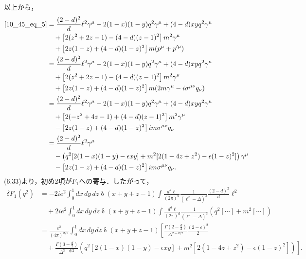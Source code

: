 以上から，
\begin{align*}
  \eqref{10_45_eq_5} &= \frac{(2-d)^2}{d} \ell^2 \gamma^\mu - 2 (1-x)(1-y) q^2 \gamma^\mu + (4-d) xy q^2 \gamma^\mu \\
  & \quad + \left[ 2(z^2 + 2z - 1) - (4-d)(z-1)^2 \right] m^2 \gamma^\mu \\
  & \quad + \left[ 2 z(1-z) + (4-d) (1-z)^2 \right] m(p^\mu + p'^\mu) \\
  &= \frac{(2-d)^2}{d} \ell^2 \gamma^\mu - 2 (1-x)(1-y) q^2 \gamma^\mu + (4-d) xy q^2 \gamma^\mu \\
  & \quad + \left[ 2(z^2 + 2z - 1) - (4-d)(z-1)^2 \right] m^2 \gamma^\mu \\
  & \quad + \left[ 2 z(1-z) + (4-d) (1-z)^2 \right] m (2m\gamma^\mu - i \sigma^{\mu\nu}q_\nu) \\
  &= \frac{(2-d)^2}{d} \ell^2 \gamma^\mu - 2 (1-x)(1-y) q^2 \gamma^\mu + (4-d) xy q^2 \gamma^\mu \\
  & \quad + \left[ 2(- z^2 + 4z - 1) + (4-d)(z-1)^2 \right] m^2 \gamma^\mu \\
  & \quad - \left[ 2 z(1-z) + (4-d) (1-z)^2 \right] im \sigma^{\mu\nu}q_\nu \\
  &= \frac{(2-d)^2}{d} \ell^2 \gamma^\mu \\
  & \quad - \left( q^2 [2(1-x)(1-y) - \epsilon xy] + m^2 [2(1-4z+z^2) - \epsilon(1-z)^2] \right) \gamma^\mu \\
  & \quad - \left[ 2 z(1-z) + (4-d) (1-z)^2 \right] im \sigma^{\mu\nu}q_\nu .
\end{align*}
(6.33)より，初め2項が$F_1$への寄与．したがって，
\begin{align*}
  \delta F_1(q^2) &= -2ie^2 \int_0^1 dx\,dy\,dz \mathop\delta(x+y+z-1) \int \frac{d^d\ell}{(2\pi)^d} \frac{1}{(\ell^2 - \Delta)^3} \frac{(2-d)^2}{d} \ell^2 \\
  & \quad + 2ie^2 \int_0^1 dx\,dy\,dz \mathop\delta(x+y+z-1) \int \frac{d^d\ell}{(2\pi)^d} \frac{1}{(\ell^2 - \Delta)^3} \left( q^2 [\cdots] + m^2 [\cdots] \right) \\
  &= \frac{e^2}{(4\pi)^{d/2}} \int_0^1 dx\,dy\,dz \mathop\delta(x+y+z-1) \left[ \frac{\Gamma(2-\frac{d}{2})}{\Delta^{2-d/2}} \frac{(2-\epsilon)^2}{2} \right. \\
  & \quad + \left. \frac{\Gamma(3-\frac{d}{2})}{\Delta^{3-d/2}} \left( q^2 [2(1-x)(1-y) - \epsilon xy] + m^2 [2(1-4z+z^2) - \epsilon(1-z)^2] \right) \right] .
\end{align*}


